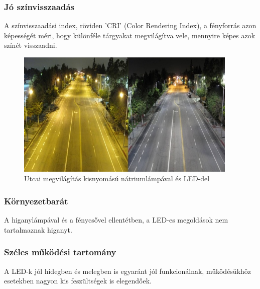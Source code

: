 \documentclass[../main.tex]{subfiles}
\begin{document}
        \subsubsection{Jó színvisszaadás}
            A színvisszaadási index, röviden 'CRI' (Color Rendering Index), a fényforrás azon képességét méri, hogy különféle tárgyakat megvilágítva vele, mennyire képes azok színét visszaadni. %
             \begin{figure}[h!] %
                \centering
                \includegraphics[height=6cm]{irodalom_res/cri_los_angeles.jpg}
                \caption{Utcai megvilágítás kisnyomású nátriumlámpával és LED-del} %
             \end{figure}
             
        \subsubsection{Környezetbarát}
            A higanylámpával és a fénycsővel ellentétben, a LED-es megoldások nem tartalmaznak higanyt.
        \subsubsection{Széles működési tartomány}
            A LED-k jól hidegben és melegben is egyaránt jól funkcionálnak, működésükhöz esetekben nagyon kis feszültségek is elegendőek.
        
        
\end{document}
